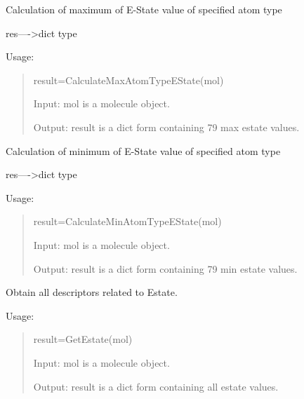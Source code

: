 \documentclass[letterpaper,10pt,english]{sphinxmanual}
\begin{document}

\begin{fulllineitems}
\label{reference/estate:estate.CalculateMaxAtomTypeEState}
Calculation of maximum of E-State value of specified atom type

res----\textgreater{}dict type

Usage:
\begin{quote}

result=CalculateMaxAtomTypeEState(mol)

Input: mol is a molecule object.

Output: result is a dict form containing 79 max estate values.
\end{quote}

\end{fulllineitems}


\begin{fulllineitems}
\label{reference/estate:estate.CalculateMinAtomTypeEState}
Calculation of minimum of E-State value of specified atom type

res----\textgreater{}dict type

Usage:
\begin{quote}

result=CalculateMinAtomTypeEState(mol)

Input: mol is a molecule object.

Output: result is a dict form containing 79 min estate values.
\end{quote}

\end{fulllineitems}


\begin{fulllineitems}
\label{reference/estate:estate.GetEstate}
Obtain all descriptors related to Estate.

Usage:
\begin{quote}

result=GetEstate(mol)

Input: mol is a molecule object.

Output: result is a dict form containing all estate values.
\end{quote}

\end{fulllineitems}
\end{document}

